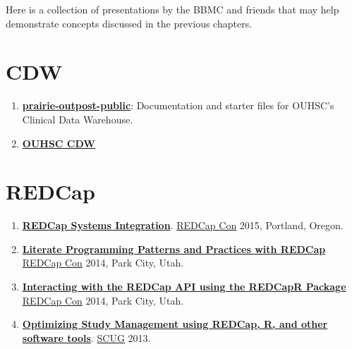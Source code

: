 \documentclass[]{book}
\providecommand{\tightlist}{%
  \setlength{\itemsep}{0pt}\setlength{\parskip}{0pt}}
\begin{document}
Here is a collection of presentations by the BBMC and friends that may help demonstrate concepts discussed in the previous chapters.

\hypertarget{cdw}{%
\section{CDW}\label{cdw}}

\begin{enumerate}
\def\labelenumi{\arabic{enumi}.}
\tightlist
\item
  \textbf{\href{https://github.com/OuhscBbmc/prairie-outpost-public}{prairie-outpost-public}}: Documentation and starter files for OUHSC's Clinical Data Warehouse.
\item
  \textbf{\href{https://github.com/OuhscBbmc/BbmcResources/blob/master/Publications/presentation-2015-11-18-cdw-bse/clinical-data-warehouse-bse.pdf}{OUHSC CDW}}
\end{enumerate}

\hypertarget{redcap}{%
\section{REDCap}\label{redcap}}

\begin{enumerate}
\def\labelenumi{\arabic{enumi}.}
\tightlist
\item
  \textbf{\href{https://github.com/OuhscBbmc/BbmcResources/blob/master/Publications/Presentation2015-09-REDCapCon/REDCapIntegration.pdf}{REDCap Systems Integration}}. \href{https://projectredcap.org/about/redcapcon/}{REDCap Con} 2015, Portland, Oregon.
\item
  \textbf{\href{https://github.com/OuhscBbmc/RedcapExamplesAndPatterns/blob/master/Publications/Presentation-2014-09-REDCapCon/LiterateProgrammingPatternsAndPracticesWithREDCap.pptx}{Literate Programming Patterns and Practices with REDCap}} \href{https://projectredcap.org/about/redcapcon/}{REDCap Con} 2014, Park City, Utah.
\item
  \textbf{\href{https://github.com/OuhscBbmc/RedcapExamplesAndPatterns/blob/master/Publications/Presentation-2014-09-REDCapCon/REDCapR.pptx}{Interacting with the REDCap API using the REDCapR Package}} \href{https://projectredcap.org/about/redcapcon/}{REDCap Con} 2014, Park City, Utah.
\item
  \textbf{\href{https://github.com/OuhscBbmc/StatisticalComputing/blob/master/2013_Presentations/03_March/RedcapForUserGroup.pptx}{Optimizing Study Management using REDCap, R, and other software tools}}. \href{https://github.com/OuhscBbmc/StatisticalComputing}{SCUG} 2013.
\end{enumerate}
\end{document}
